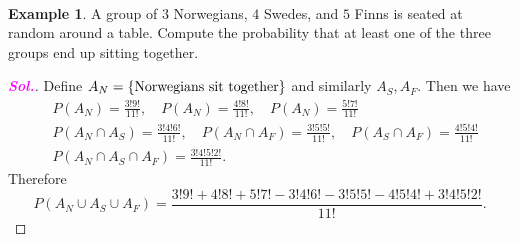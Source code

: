 \documentclass[12pt,a4paper]{article}
\theoremstyle{definition}
\newtheorem{example}{Example}[section]
\theoremstyle{definition}
\theoremstyle{definition}
\theoremstyle{definition}
\theoremstyle{remark}
\theoremstyle{definition}
\newcommand{\sol}{\textcolor{magenta}{\bf \textit{Sol.}}\quad}
\begin{document}
\
\begin{example}
	A group of $3$ Norwegians, $4$ Swedes, and $5$ Finns is seated at random around a table. Compute the probability that at least one of the three groups end up sitting together.
	\begin{proof}[\sol]
		Define $A_N=\set{\text{Norwegians sit together}}$ and similarly $A_S, A_F$. Then we have \begin{align*}
		&P(A_N)=\frac{3!9!}{11!},\quad P(A_N)=\frac{4!8!}{11!},\quad
		P(A_N)=\frac{5!7!}{11!}\\
		&P(A_N\cap A_S)=\frac{3!4!6!}{11!},\quad
		P(A_N\cap A_F)=\frac{3!5!5!}{11!},\quad
		P(A_S\cap A_F)=\frac{4!5!4!}{11!}\\
		&P(A_N\cap A_S\cap A_F)=\frac{3!4!5!2!}{11!}.
		\end{align*} Therefore \[
		P(A_N\cup A_S\cup A_F)=\frac{3!9!+4!8!+5!7!-3!4!6!-3!5!5!-4!5!4!+3!4!5!2!}{11!}.
		\]
	\end{proof}
\end{example}
\
\end{document}
